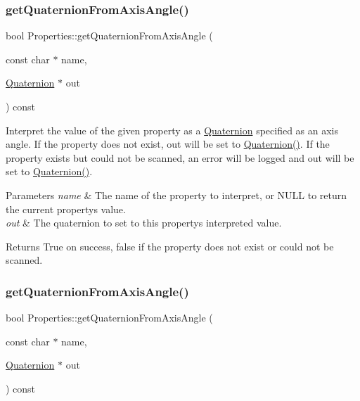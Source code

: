 \subsubsection{\texorpdfstring{get\+Quaternion\+From\+Axis\+Angle()}{getQuaternionFromAxisAngle()}\hspace{0.1cm}{\footnotesize\ttfamily [1/2]}}
{\footnotesize\ttfamily bool Properties\+::get\+Quaternion\+From\+Axis\+Angle (\begin{DoxyParamCaption}\item[{const char $\ast$}]{name,  }\item[{\hyperlink{classQuaternion}{Quaternion} $\ast$}]{out }\end{DoxyParamCaption}) const}

Interpret the value of the given property as a \hyperlink{classQuaternion}{Quaternion} specified as an axis angle. If the property does not exist, out will be set to \hyperlink{classQuaternion}{Quaternion()}. If the property exists but could not be scanned, an error will be logged and out will be set to \hyperlink{classQuaternion}{Quaternion()}.


\begin{DoxyParams}{Parameters}
{\em name} & The name of the property to interpret, or N\+U\+LL to return the current property\textquotesingle{}s value. \\
\hline
{\em out} & The quaternion to set to this property\textquotesingle{}s interpreted value.\\
\hline
\end{DoxyParams}
\begin{DoxyReturn}{Returns}
True on success, false if the property does not exist or could not be scanned. 
\end{DoxyReturn}
\mbox{\label{classProperties_a609e433cb5798c88b2f87ef036ed3a73}} 
\subsubsection{\texorpdfstring{get\+Quaternion\+From\+Axis\+Angle()}{getQuaternionFromAxisAngle()}\hspace{0.1cm}{\footnotesize\ttfamily [2/2]}}
{\footnotesize\ttfamily bool Properties\+::get\+Quaternion\+From\+Axis\+Angle (\begin{DoxyParamCaption}\item[{const char $\ast$}]{name,  }\item[{\hyperlink{classQuaternion}{Quaternion} $\ast$}]{out }\end{DoxyParamCaption}) const}

